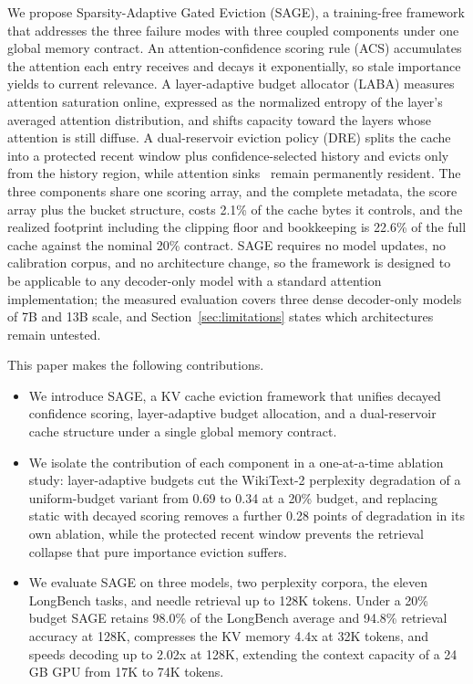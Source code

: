 We propose Sparsity-Adaptive Gated Eviction (SAGE), a training-free
framework that addresses the three failure modes with three coupled
components under one global memory contract. An attention-confidence
scoring rule (ACS) accumulates the attention each entry receives and
decays it exponentially, so stale importance yields to current
relevance. A layer-adaptive budget allocator (LABA) measures attention
saturation online, expressed as the normalized entropy of the layer's
averaged attention distribution, and shifts capacity toward the layers
whose attention is still diffuse. A dual-reservoir eviction policy
(DRE) splits the cache into a protected recent window plus
confidence-selected history and evicts only from the history region,
while attention sinks~\cite{xiao2023efficient} remain permanently
resident. The three components share one scoring array, and the
complete metadata, the score array plus the bucket structure, costs
2.1\% of the cache bytes it controls, and the realized footprint
including the clipping floor and bookkeeping is 22.6\% of the full
cache against the nominal 20\% contract.
SAGE requires no model updates, no calibration corpus, and no
architecture change, so the framework is designed to be applicable to
any decoder-only model with a standard attention implementation; the
measured evaluation covers three dense decoder-only models of 7B and
13B scale, and Section~\ref{sec:limitations} states which
architectures remain untested.

This paper makes the following contributions.
\begin{itemize}[leftmargin=1.6em, itemsep=2pt, topsep=3pt]
\item We introduce SAGE, a KV cache eviction framework that unifies
      decayed confidence scoring, layer-adaptive budget allocation, and
      a dual-reservoir cache structure under a single global memory
      contract.
\item We isolate the contribution of each component in a
      one-at-a-time ablation study: layer-adaptive budgets cut the
      WikiText-2 perplexity degradation of a uniform-budget variant
      from 0.69 to 0.34 at a 20\% budget, and replacing static with
      decayed scoring removes a further 0.28 points of degradation in
      its own ablation, while the protected recent window prevents the
      retrieval collapse that pure importance eviction suffers.
\item We evaluate SAGE on three models, two perplexity corpora, the
      eleven LongBench tasks, and needle retrieval up to 128K tokens.
      Under a 20\% budget SAGE retains 98.0\% of the LongBench average
      and 94.8\% retrieval accuracy at 128K, compresses the KV memory
      4.4x at 32K tokens, and speeds decoding up to 2.02x at 128K,
      extending the context capacity of a 24 GB GPU from 17K to 74K
      tokens.
\end{itemize}

